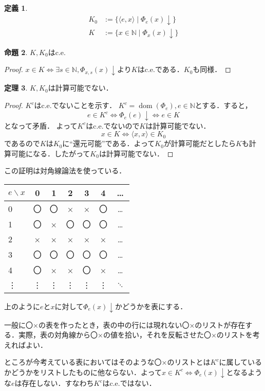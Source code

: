 \documentclass[uplatex]{jsarticle}
\newcommand{\N}{\mathbb{N}}
\newcommand{\dom}{\operatorname{dom}}
\theoremstyle{definition} %
\newtheorem{thm}{定理}
\newtheorem{defi}[thm]{定義}
\newtheorem{prop}[thm]{命題}
\begin{document}
\begin{defi}
\begin{align*}
K_0 &:= \{\langle e,x \rangle \mid \Phi_e(x) \downarrow \} \\
K &:= \{x \in \N \mid \Phi_x(x) \downarrow \}
\end{align*}
\end{defi}

\begin{prop}
$K, K_0$はc.e.
\end{prop}
\begin{proof}
$x \in K \iff \exists s\in\N, \Phi_{x,s}(x)\downarrow$より$K$はc.e.である．$K_0$も同様．
\end{proof}

\begin{thm}
$K, K_0$は計算可能でない．
\end{thm}
\begin{proof}
$K^c$はc.e.でないことを示す．
$K^c = \dom(\Phi_e), e\in\N$とする．すると，
\[e \in K^c \iff \Phi_e(e)\downarrow \iff e \in K \]
となって矛盾．
よって$K^c$はc.e.でないので$K$は計算可能でない．
\[x \in K \iff \langle x, x \rangle \in K_0\]
であるので$K$は$K_0$に“還元可能”である．よって$K_0$が計算可能だとしたら$K$も計算可能になる．したがって$K_0$は計算可能でない．
\end{proof}

この証明は対角線論法を使っている．

\begin{table}[!h]
\begin{tabular}{l|cccccc}
$e \backslash x$ & 0 & 1 & 2 & 3 & 4 & \dots \\	\hline
0 & 〇 & 〇 & × & × & 〇 & \dots \\
1 & 〇 & × & 〇 & 〇 & 〇 & \dots \\
2 & × & × & × & × & × & \dots \\
3 & 〇 & 〇 & 〇 & 〇 & 〇 & \dots \\
4 & 〇 & × & × & 〇 & × & \dots \\
\vdots & \vdots & \vdots & \vdots & \vdots & \vdots & $\ddots$
\end{tabular}
\end{table}

上のように$e$と$x$に対して$\Phi_e(x)\downarrow$かどうかを表にする．

一般に〇×の表を作ったとき，表の中の行には現れない〇×のリストが存在する．実際，表の対角線から〇×の値を拾い，それを反転させた〇×のリストを考えればよい．

ところが今考えている表においてはそのような〇×のリストとは$K^c$に属しているかどうかをリストしたものに他ならない．よって$x \in K^c \iff \Phi_e(x)\downarrow$となるような$e$は存在しない．すなわち$K^c$はc.e.ではない．
\end{document}
